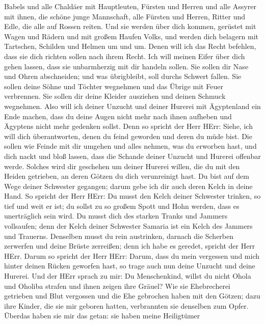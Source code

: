 Babels und alle Chaldäer mit Hauptleuten, Fürsten und Herren und alle
Assyrer mit ihnen, die schöne junge Mannschaft, alle Fürsten und Herren,
Ritter und Edle, die alle auf Rossen reiten.  Und sie
werden über dich kommen, gerüstet mit Wagen und Rädern und mit großem
Haufen Volks, und werden dich belagern mit Tartschen, Schilden und
Helmen um und um. Denen will ich das Recht befehlen, dass sie dich
richten sollen nach ihrem Recht.  Ich will meinen Eifer
über dich gehen lassen, dass sie unbarmherzig mit dir handeln sollen.
Sie sollen dir Nase und Ohren abschneiden; und was übrigbleibt, soll
durchs Schwert fallen. Sie sollen deine Söhne und Töchter wegnehmen und
das Übrige mit Feuer verbrennen.  Sie sollen dir deine
Kleider ausziehen und deinen Schmuck wegnehmen.  Also will
ich deiner Unzucht und deiner Hurerei mit Ägyptenland ein Ende machen,
dass du deine Augen nicht mehr nach ihnen aufheben und Ägyptens nicht
mehr gedenken sollst.  Denn so spricht der Herr HErr:
Siehe, ich will dich überantworten, denen du feind geworden und deren du
müde bist.  Die sollen wie Feinde mit dir umgehen und alles
nehmen, was du erworben hast, und dich nackt und bloß lassen, dass die
Schande deiner Unzucht und Hurerei offenbar werde.  Solches
wird dir geschehen um deiner Hurerei willen, die du mit den Heiden
getrieben, an deren Götzen du dich verunreinigt hast.  Du
bist auf dem Wege deiner Schwester gegangen; darum gebe ich dir auch
deren Kelch in deine Hand.  So spricht der Herr HErr: Du
musst den Kelch deiner Schwester trinken, so tief und weit er ist; du
sollst zu so großem Spott und Hohn werden, dass es unerträglich sein
wird.  Du musst dich des starken Tranks und Jammers
vollsaufen; denn der Kelch deiner Schwester Samaria ist ein Kelch des
Jammers und Trauerns.  Denselben musst du rein austrinken,
darnach die Scherben zerwerfen und deine Brüste zerreißen; denn ich habe
es geredet, spricht der Herr HErr.  Darum so spricht der
Herr HErr: Darum, dass du mein vergessen und mich hinter deinen Rücken
geworfen hast, so trage auch nun deine Unzucht und deine Hurerei.
 Und der HErr sprach zu mir: Du Menschenkind, willst du
nicht Ohola und Oholiba strafen und ihnen zeigen ihre Gräuel?
 Wie sie Ehebrecherei getrieben und Blut vergossen und die
Ehe gebrochen haben mit den Götzen; dazu ihre Kinder, die sie mir
geboren hatten, verbrannten sie denselben zum Opfer. 
Überdas haben sie mir das getan: sie haben meine Heiligtümer
